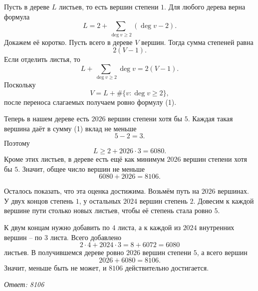 Пусть в дереве $L$ листьев, то есть вершин степени $1$. Для любого дерева верна формула
\[
L=2+\sum_{\deg v\ge 2}(\deg v-2). \tag{1}
\]
Докажем её коротко. Пусть всего в дереве $V$ вершин. Тогда сумма степеней равна
\[
2(V-1).
\]
Если отделить листья, то
\[
L+\sum_{\deg v\ge 2}\deg v=2(V-1).
\]
Поскольку
\[
V=L+\#\{v:\deg v\ge 2\},
\]
после переноса слагаемых получаем ровно формулу (1).

Теперь в нашем дереве есть $2026$ вершин степени хотя бы $5$. Каждая такая вершина даёт в сумму (1) вклад не меньше
\[
5-2=3.
\]
Поэтому
\[
L\ge 2+2026\cdot 3=6080.
\]
Кроме этих листьев, в дереве есть ещё как минимум $2026$ вершин степени хотя бы $5$. Значит, общее число вершин не меньше
\[
6080+2026=8106. \tag{2}
\]

Осталось показать, что эта оценка достижима. Возьмём путь на $2026$ вершинах. У двух концов степень $1$, у остальных $2024$ вершин степень $2$. Довесим к каждой вершине пути столько новых листьев, чтобы её степень стала ровно $5$.

К двум концам нужно добавить по $4$ листа, а к каждой из $2024$ внутренних вершин -- по $3$ листа. Всего добавлено
\[
2\cdot 4+2024\cdot 3=8+6072=6080
\]
листьев. В получившемся дереве ровно $2026$ вершин степени $5$, а всего вершин
\[
2026+6080=8106.
\]
Значит, меньше быть не может, и $8106$ действительно достигается.

\textit{Ответ: 8106}